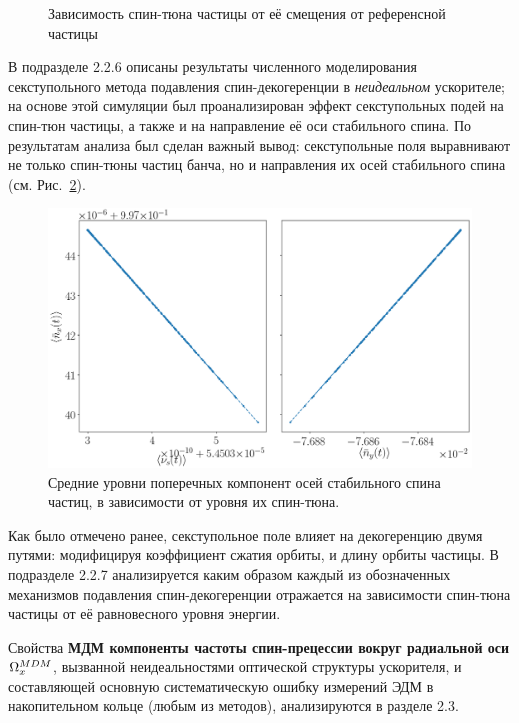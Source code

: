 \begin{figure}[H]
\begin{minipage}{.5\linewidth}
	\end{minipage}%
	\begin{minipage}{.5\linewidth}
	\caption{Зависимость спин-тюна частицы от её смещения от референсной частицы\label{fig:decoh:perfect}}
	\end{minipage}
\end{figure}

В подразделе 2.2.6 описаны результаты численного моделирования секступольного метода 
подавления спин-декогеренции в \emph{неидеальном} ускорителе; на основе этой симуляции был проанализирован
эффект секступольных подей на спин-тюн частицы, а также и на направление её оси стабильного спина. 
По результатам анализа был сделан важный вывод: секступольные поля выравнивают не только спин-тюны
частиц банча, но и направления их осей стабильного спина (см. Рис.~\ref{decoh:fig:nbar_vs_ST}).

\begin{figure}[H]\centering
	\includegraphics[height=.3\paperheight]{images/decoh_sim/mean_n_bar_vs_spin_tune}
	\caption{Средние уровни поперечных компонент осей стабильного спина частиц, в зависимости от уровня их спин-тюна.\label{decoh:fig:nbar_vs_ST}}
\end{figure}

Как было отмечено ранее, секступольное поле влияет на декогеренцию двумя путями: 
модифицируя коэффициент сжатия орбиты, и длину орбиты частицы.
В подразделе 2.2.7 анализируется каким образом каждый из обозначенных механизмов 
подавления спин-декогеренции отражается на зависимости спин-тюна частицы
от её равновесного уровня энергии.

Свойства \textbf{МДМ компоненты частоты спин-прецессии вокруг радиальной оси} $\Omega_x^{MDM}$, вызванной 
неидеальностями оптической структуры ускорителя, и составляющей основную 
систематическую ошибку измерений ЭДМ в накопительном кольце (любым из методов), анализируются в разделе 2.3.

